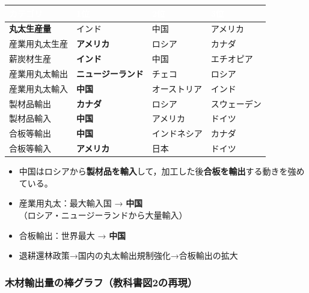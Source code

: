 \documentclass[a4paper,11pt]{article}
\newcommand{\imp}[1]{\textbf{\textcolor{mainred}{#1}}}
\begin{document}
\begin{center}
\renewcommand{\arraystretch}{1.2}
\begin{tabular}{C{2.5cm}C{3.5cm}C{3.5cm}C{3.5cm}}
\toprule
{}\textcolor{white}{\textbf{カテゴリ}} & \textcolor{white}{\textbf{1位}} & \textcolor{white}{\textbf{2位}} & \textcolor{white}{\textbf{3位}} \\
\midrule
{}
\textbf{丸太生産量} & インド & 中国 & アメリカ \\
産業用丸太生産 & \imp{アメリカ} & ロシア & カナダ \\
薪炭材生産 & \imp{インド} & 中国 & エチオピア \\
産業用丸太輸出 & \imp{ニュージーランド} & チェコ & ロシア \\
産業用丸太輸入 & \imp{中国} & オーストリア & インド \\
製材品輸出 & \imp{カナダ} & ロシア & スウェーデン \\
製材品輸入 & \imp{中国} & アメリカ & ドイツ \\
合板等輸出 & \imp{中国} & インドネシア & カナダ \\
合板等輸入 & \imp{アメリカ} & 日本 & ドイツ \\
\bottomrule
\end{tabular}
\end{center}

\begin{tcolorbox}[warnbox, title={🔑 中国の特殊な立ち位置（最重要）}]
\begin{itemize}[leftmargin=1em]
  \item 中国はロシアから\imp{製材品を輸入}して，加工した後\imp{合板を輸出}する動きを強めている。
  \item 産業用丸太：最大輸入国 → \imp{中国}（ロシア・ニュージーランドから大量輸入）
  \item 合板輸出：世界最大 → \imp{中国}
  \item 退耕還林政策→国内の丸太輸出規制強化→合板輸出の拡大
\end{itemize}
\end{tcolorbox}

\vspace{2mm}

\subsubsection{木材輸出量の棒グラフ（教科書図2の再現）}
\end{document}
